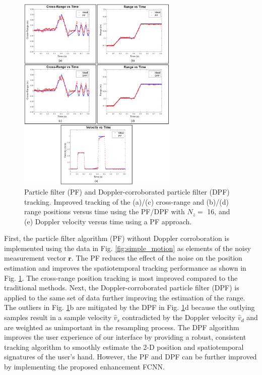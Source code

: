 \documentclass[10pt,journal,final]{IEEEtran}
\begin{document}
\begin{figure}[h]
	\centering
	\includegraphics[width=3in]{pf_motion.jpg}
	\caption{Particle filter (PF) and Doppler-corroborated particle filter (DPF) tracking. Improved tracking of the (a)/(c) cross-range and (b)/(d) range positions versus time using the PF/DPF with $N_z =$ 16, and (e) Doppler velocity versus time using a PF approach.}
	\label{fig:pf_motion}
\end{figure}

First, the particle filter algorithm (PF) without Doppler corroboration is implemented using the data in Fig. \ref{fig:simple_motion} as elements of the noisy measurement vector $\mathbf{r}$. 
The PF reduces the effect of the noise on the position estimation and improves the spatiotemporal tracking performance as shown in Fig. \ref{fig:pf_motion}.
The cross-range position tracking is most improved compared to the traditional methods.
Next, the Doppler-corroborated particle filter (DPF) is applied to the same set of data further improving the estimation of the range. 
The outliers in Fig. \ref{fig:pf_motion}b are mitigated by the DPF in Fig. \ref{fig:pf_motion}d because the outlying samples result in a sample velocity $\hat{v}_s$ contradicted by the Doppler velocity $\hat{v}_d$ and are weighted as unimportant in the resampling process.
The DPF algorithm improves the user experience of our interface by providing a robust, consistent tracking algorithm to smoothly estimate the 2-D position and spatiotemporal signatures of the user's hand.
However, the PF and DPF can be further improved by implementing the proposed enhancement FCNN.
\end{document}
